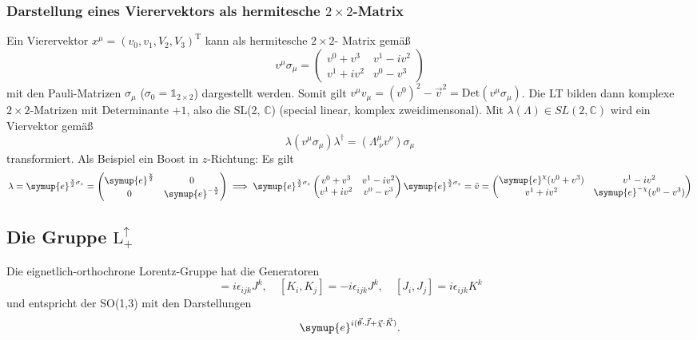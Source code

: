 \documentclass[
  captions=tableheading,  %
  titlepage=firstiscover, %
]{scrartcl}
\begin{document}
\subsubsection{Darstellung eines Vierervektors als hermitesche \texorpdfstring{$2 \times 2$}{PDFstring}-Matrix}
\label{sub:2times2}
Ein Vierervektor $x^{\mu} = (v_0, v_1, V_2, V_3)^\text{T}$ kann als 
hermitesche $2 \times 2$- Matrix gemäß
\begin{equation*}
  v^{\mu} \sigma_{\mu} = 
  \begin{pmatrix}
    v^0 + v^3& v^1 - iv^2 \\
    v^1 + iv^2 & v^0 - v^3
  \end{pmatrix}
\end{equation*}
mit den Pauli-Matrizen $\sigma_{\mu}$ ($\sigma_0 = \mathbb{1}_{2 \times 2}$) dargestellt werden.
Somit gilt $v^{\mu} v_{\mu} = {(v^0)^2 - \vec{v}^2} = \text{Det}(v^{\mu} \sigma_{\mu})$.
Die LT bilden dann komplexe $2\times 2$-Matrizen mit Determinante $+ 1$, also  
die SL(2, $\mathbb{C}$) (special linear, komplex zweidimensonal).
Mit $\lambda(\Lambda) \in SL(2, \mathbb{C})$ wird ein Viervektor gemäß
\begin{equation*}
  \lambda (v^{\mu} \sigma_{\mu}) \lambda^{\dagger} = (\Lambda_{\; \nu}^{\mu} v^{\nu}) \sigma_{\mu}
\end{equation*}
transformiert.
Als Beispiel ein Boost in $z$-Richtung: Es gilt 
\begin{equation*}
  \lambda  = \symup{e}^{\frac{\chi}{2} \sigma_z}
  =
  \begin{pmatrix}
    \symup{e}^{\frac{\chi}{2}} & 0 \\
    0 & \symup{e}^{-\frac{\chi}{2}}
  \end{pmatrix}
  \implies  
  \symup{e}^{\frac{\chi}{2} \sigma_z} 
  \begin{pmatrix}
    v^0 + v^3& v^1 - iv^2 \\
    v^1 + iv^2 & v^0 - v^3
  \end{pmatrix}
  \symup{e}^{\frac{\chi}{2} \sigma_z} 
  = \tilde{v} =
  \begin{pmatrix}
    \symup{e}^{\chi} (v^0 + v^3) & v^1 - iv^2 \\
    v^1 + iv^2 & \symup{e}^{-\chi}(v^0 - v^3)
  \end{pmatrix}
\end{equation*}
\subsection{Die Gruppe \texorpdfstring{$\text{L}_+^{\uparrow}$}{PDFstring} }
Die eignetlich-orthochrone Lorentz-Gruppe hat die Generatoren 
\begin{equation*}
  [J_i,J_j] = i \epsilon_{ijk} J^k,\quad [K_i, K_j] = - i \epsilon_{ijk} J^k, 
  \quad [J_i,J_j] = i \epsilon_{ijk} K^k \label{eqn:genspinor}
\end{equation*}
und entspricht der SO(1,3) mit den Darstellungen
\begin{equation*}
  \symup{e}^{i(\vec{\theta} \cdot \vec{J} + \vec{\chi} \cdot \vec{K})}.
\end{equation*}
\end{document}
